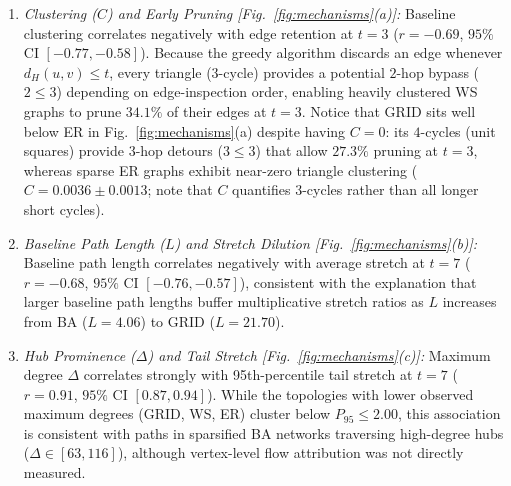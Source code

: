 \documentclass[conference]{IEEEtran}
\begin{document}
\begin{enumerate}
    \item \textit{Clustering ($C$) and Early Pruning [Fig.~\ref{fig:mechanisms}(a)]:} Baseline clustering correlates negatively with edge retention at $t=3$ ($r = -0.69$, $95\%$ CI $[-0.77, -0.58]$). Because the greedy algorithm discards an edge whenever $d_H(u, v) \le t$, every triangle ($3$-cycle) provides a potential $2$-hop bypass ($2 \le 3$) depending on edge-inspection order, enabling heavily clustered WS graphs to prune $34.1\%$ of their edges at $t=3$. Notice that GRID sits well below ER in Fig.~\ref{fig:mechanisms}(a) despite having $C = 0$: its $4$-cycles (unit squares) provide $3$-hop detours ($3 \le 3$) that allow $27.3\%$ pruning at $t=3$, whereas sparse ER graphs exhibit near-zero triangle clustering ($C = 0.0036 \pm 0.0013$; note that $C$ quantifies $3$-cycles rather than all longer short cycles).
    \item \textit{Baseline Path Length ($L$) and Stretch Dilution [Fig.~\ref{fig:mechanisms}(b)]:} Baseline path length correlates negatively with average stretch at $t=7$ ($r = -0.68$, $95\%$ CI $[-0.76, -0.57]$), consistent with the explanation that larger baseline path lengths buffer multiplicative stretch ratios as $L$ increases from BA ($L=4.06$) to GRID ($L=21.70$).
    \item \textit{Hub Prominence ($\Delta$) and Tail Stretch [Fig.~\ref{fig:mechanisms}(c)]:} Maximum degree $\Delta$ correlates strongly with 95th-percentile tail stretch at $t=7$ ($r = 0.91$, $95\%$ CI $[0.87, 0.94]$). While the topologies with lower observed maximum degrees (GRID, WS, ER) cluster below $P_{95} \le 2.00$, this association is consistent with paths in sparsified BA networks traversing high-degree hubs ($\Delta \in [63, 116]$), although vertex-level flow attribution was not directly measured.

\end{enumerate}
\end{document}

